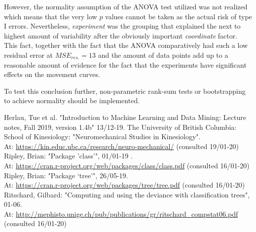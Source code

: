 \documentclass[11pt,fleqn]{article}
\begin{document}
However, the normality assumption of the ANOVA test utilized was not realized which means that the very low \(p\) values cannot be taken as the actual risk of type I errors. 
Nevertheless, \textit{experiment} was the grouping that explained the next to highest amount of  variability after the obviously important \textit{coordinate} factor. 
This fact, together with the fact that the ANOVA comparatively had such a low residual error at \(MSE_{res.}=13\) and the amount of data points add up to a reasonable amount of evidence for the fact that the experiments have significant effects on the movement curves. 

To test this conclusion further, non-parametric rank-sum tests or bootstrapping to achieve normality should be implemented.


\begin{thebibliography}{9}
	 Herlau, Tue et al. "Introduction to Machine Learning and Data Mining: Lecture notes, Fall 2019, version 1.4b" 13/12-19.
		 The University of British Columbia: School of Kinesiology:
	"Neuromechanical Studies in Kinesiology". \\
	At:
	\url{https://kin.educ.ubc.ca/research/neuro-mechanical/} (consulted 19/01-20)
	 Ripley, Brian: "Package ’class’", 01/01-19 .\\
	At:
	\url{https://cran.r-project.org/web/packages/class/class.pdf} (consulted 16/01-20)
	 Ripley, Brian: "Package ‘tree’", 26/05-19.\\ At: \url{https://cran.r-project.org/web/packages/tree/tree.pdf} (consulted 16/01-20)
	 Ritschard, Gilbard: "Computing and using the deviance with classification trees", 01-06.\\
	 At:
	\url{http://mephisto.unige.ch/pub/publications/gr/ritschard_compstat06.pdf} (consulted 16/01-20)

\end{thebibliography}
\appendix
\end{document}
